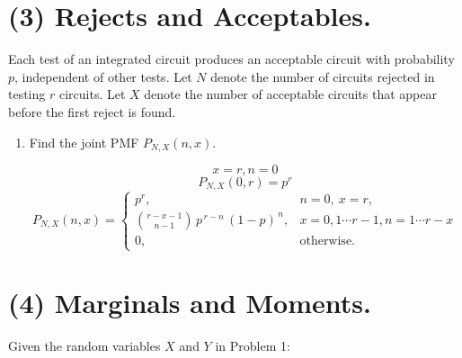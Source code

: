 \documentclass[12pt]{article}
\newenvironment{bluetext}
    {\par\begingroup\color{blue}\parindent=0pt\ignorespaces}
    {\par\endgroup\noindent\ignorespacesafterend}
\begin{document}
\section*{(3) Rejects and Acceptables.}

Each test of an integrated circuit produces an acceptable circuit with probability $p$, independent of other tests. Let $N$ denote the number of circuits rejected in testing $r$ circuits. Let $X$ denote the number of acceptable circuits that appear before the first reject is found.

\begin{enumerate}
    \item[(a)] Find the joint PMF $P_{N,X}(n, x)$.
    \begin{bluetext}
        \[x=r, n=0\]
        \[P_{N,X}(0,r)=p^r\]
        \[P_{N,X}(n,x)=
        \begin{cases}
        p^r, & n=0,\ x=r,\\
        \displaystyle \binom{r-x-1}{\,n-1\,}\,p^{\,r-n}\,(1-p)^{\,n}, & x=0,1 \cdots r-1, n=1\cdots r-x \\
        0, & \text{otherwise.}
        \end{cases}
        \]
    \end{bluetext}
\end{enumerate}
\newpage
\section*{(4) Marginals and Moments.}

Given the random variables $X$ and $Y$ in Problem 1:
\end{document}
